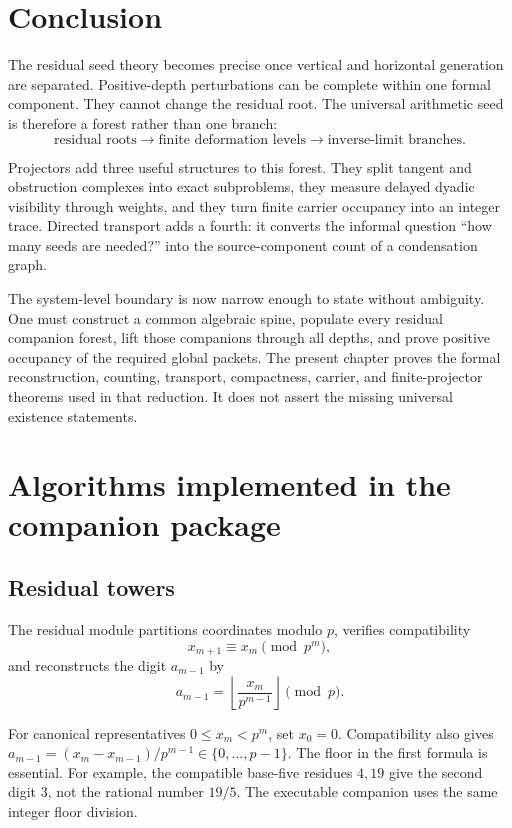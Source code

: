 \documentclass[11pt]{article}
\theoremstyle{definition}
\theoremstyle{remark}
\begin{document}
\section{Conclusion}

The residual seed theory becomes precise once vertical and horizontal generation are separated.  Positive-depth perturbations can be complete within one formal component.  They cannot change the residual root.  The universal arithmetic seed is therefore a forest rather than one branch:
\[
\boxed{
\text{residual roots}
\longrightarrow
\text{finite deformation levels}
\longrightarrow
\text{inverse-limit branches}.
}
\]

Projectors add three useful structures to this forest.  They split tangent and obstruction complexes into exact subproblems, they measure delayed dyadic visibility through weights, and they turn finite carrier occupancy into an integer trace.  Directed transport adds a fourth: it converts the informal question ``how many seeds are needed?'' into the source-component count of a condensation graph.

The system-level boundary is now narrow enough to state without ambiguity.  One must construct a common algebraic spine, populate every residual companion forest, lift those companions through all depths, and prove positive occupancy of the required global packets.  The present chapter proves the formal reconstruction, counting, transport, compactness, carrier, and finite-projector theorems used in that reduction.  It does not assert the missing universal existence statements.

\appendix

\section{Algorithms implemented in the companion package}

\subsection{Residual towers}

The residual module partitions coordinates modulo \(p\), verifies compatibility
\[
x_{m+1}\equiv x_m\pmod{p^m},
\]
and reconstructs the digit \(a_{m-1}\) by
\[
a_{m-1}=\left\lfloor\frac{x_m}{p^{m-1}}\right\rfloor\pmod p.
\]

For canonical representatives $0\le x_m<p^m$, set $x_0=0$. Compatibility also gives
$a_{m-1}=(x_m-x_{m-1})/p^{m-1}\in\{0,\ldots,p-1\}$.
The floor in the first formula is essential. For example, the compatible
base-five residues $4,19$ give the second digit $3$, not the rational number $19/5$.
The executable companion uses the same integer floor division.
\end{document}
